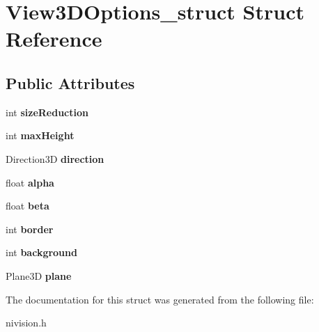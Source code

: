 \hypertarget{structView3DOptions__struct}{
\section{View3DOptions\_\-struct Struct Reference}
\label{structView3DOptions__struct}
}
\subsection*{Public Attributes}
\begin{DoxyCompactItemize}
\item 
\hypertarget{structView3DOptions__struct_a23dc08fec5e9591a5d9bf39f26fd1cfb}{
int {\bfseries sizeReduction}}
\label{structView3DOptions__struct_a23dc08fec5e9591a5d9bf39f26fd1cfb}

\item 
\hypertarget{structView3DOptions__struct_a4fa1b51912be7069faf5ec0db0286e0c}{
int {\bfseries maxHeight}}
\label{structView3DOptions__struct_a4fa1b51912be7069faf5ec0db0286e0c}

\item 
\hypertarget{structView3DOptions__struct_abff4464b5ae5963f0a581e6d0ea9e9e8}{
Direction3D {\bfseries direction}}
\label{structView3DOptions__struct_abff4464b5ae5963f0a581e6d0ea9e9e8}

\item 
\hypertarget{structView3DOptions__struct_a00dbe0b5c9142ef96fe1d3c1902ccfd8}{
float {\bfseries alpha}}
\label{structView3DOptions__struct_a00dbe0b5c9142ef96fe1d3c1902ccfd8}

\item 
\hypertarget{structView3DOptions__struct_a947480d0d227b7ce32a84fcef1ab0de1}{
float {\bfseries beta}}
\label{structView3DOptions__struct_a947480d0d227b7ce32a84fcef1ab0de1}

\item 
\hypertarget{structView3DOptions__struct_a4dbbf9ce33b166db5a0b741a7cf67325}{
int {\bfseries border}}
\label{structView3DOptions__struct_a4dbbf9ce33b166db5a0b741a7cf67325}

\item 
\hypertarget{structView3DOptions__struct_af667dbc054915bac707d2e5a51b32a7e}{
int {\bfseries background}}
\label{structView3DOptions__struct_af667dbc054915bac707d2e5a51b32a7e}

\item 
\hypertarget{structView3DOptions__struct_a0ca78546e6f56abe9ab5ec2425cb73aa}{
Plane3D {\bfseries plane}}
\label{structView3DOptions__struct_a0ca78546e6f56abe9ab5ec2425cb73aa}

\end{DoxyCompactItemize}


The documentation for this struct was generated from the following file:\begin{DoxyCompactItemize}
\item 
nivision.h\end{DoxyCompactItemize}
